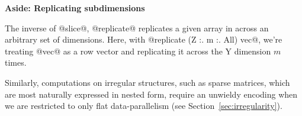\begin{aside}
\begin{center}
\textbf{Aside: Replicating subdimensions}
\end{center}
The inverse of @slice@, @replicate@ replicates a given array in across an arbitrary set of dimensions. Here, with @replicate (Z :. m :. All) vec@, we're treating @vec@ as a row vector and replicating it across the Y dimension $m$ times.
\end{aside}

Similarly, computations on irregular structures, such as sparse matrices, which are most naturally expressed in nested form, require an unwieldy encoding when we are restricted to only flat data-parallelism (see Section~\ref{sec:irregularity}).




%
%
%

